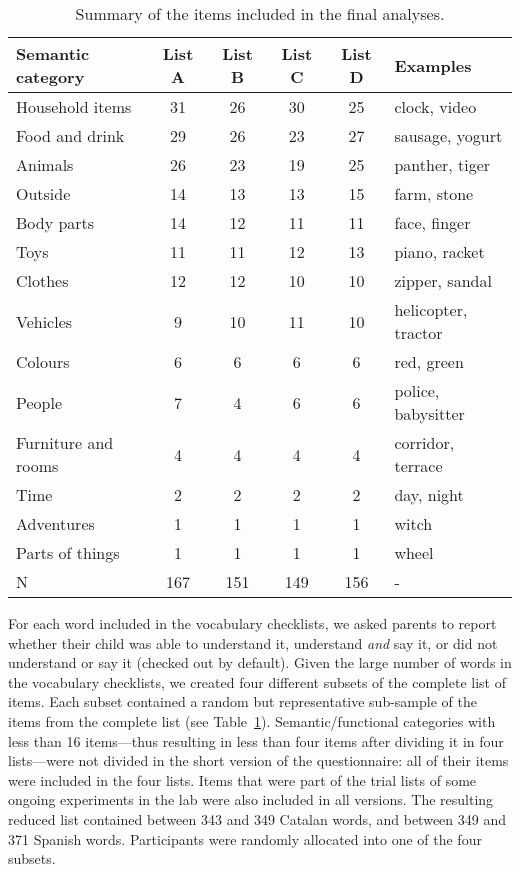 \documentclass[
]{article}
\begin{document}
\hypertarget{tbl-items}{}
\begin{table}
\caption{\label{tbl-items}Summary of the items included in the final analyses. }\tabularnewline

\centering
\begin{tabular}{lccccl}
\toprule
Semantic category & List A & List B & List C & List D & Examples\\
\midrule
Household items & 31 & 26 & 30 & 25 & clock, video\\
Food and drink & 29 & 26 & 23 & 27 & sausage, yogurt\\
Animals & 26 & 23 & 19 & 25 & panther, tiger\\
Outside & 14 & 13 & 13 & 15 & farm, stone\\
Body parts & 14 & 12 & 11 & 11 & face, finger\\
\addlinespace
Toys & 11 & 11 & 12 & 13 & piano, racket\\
Clothes & 12 & 12 & 10 & 10 & zipper, sandal\\
Vehicles & 9 & 10 & 11 & 10 & helicopter, tractor\\
Colours & 6 & 6 & 6 & 6 & red, green\\
People & 7 & 4 & 6 & 6 & police, babysitter\\
\addlinespace
Furniture and rooms & 4 & 4 & 4 & 4 & corridor, terrace\\
Time & 2 & 2 & 2 & 2 & day, night\\
Adventures & 1 & 1 & 1 & 1 & witch\\
Parts of things & 1 & 1 & 1 & 1 & wheel\\
\midrule
N & 167 & 151 & 149 & 156 & -\\
\bottomrule
\end{tabular}
\end{table}

For each word included in the vocabulary checklists, we asked parents to
report whether their child was able to understand it, understand
\emph{and} say it, or did not understand or say it (checked out by
default). Given the large number of words in the vocabulary checklists,
we created four different subsets of the complete list of items. Each
subset contained a random but representative sub-sample of the items
from the complete list (see Table~\ref{tbl-items}). Semantic/functional
categories with less than 16 items---thus resulting in less than four
items after dividing it in four lists---were not divided in the short
version of the questionnaire: all of their items were included in the
four lists. Items that were part of the trial lists of some ongoing
experiments in the lab were also included in all versions. The resulting
reduced list contained between 343 and 349 Catalan words, and between
349 and 371 Spanish words. Participants were randomly allocated into one
of the four subsets.
\end{document}
